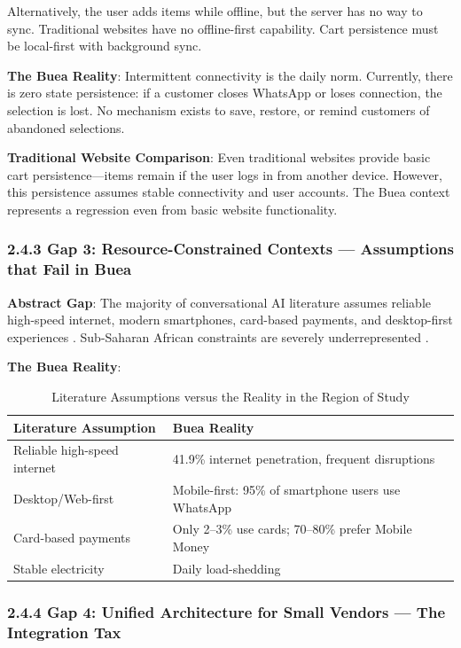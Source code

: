 \documentclass[12pt,a4paper]{article}
\begin{document}
Alternatively, the user adds items while offline, but the server has no way to sync. Traditional websites have no offline-first capability. Cart persistence must be local-first with background sync.

\textbf{The Buea Reality}: Intermittent connectivity is the daily norm. Currently, there is zero state persistence: if a customer closes WhatsApp or loses connection, the selection is lost. No mechanism exists to save, restore, or remind customers of abandoned selections.

\textbf{Traditional Website Comparison}: Even traditional websites provide basic cart persistence---items remain if the user logs in from another device. However, this persistence assumes stable connectivity and user accounts. The Buea context represents a regression even from basic website functionality.

\subsubsection{2.4.3 Gap 3: Resource-Constrained Contexts --- Assumptions that Fail in Buea}

\textbf{Abstract Gap}: The majority of conversational AI literature assumes reliable high-speed internet, modern smartphones, card-based payments, and desktop-first experiences \citep{lopez2025}. Sub-Saharan African constraints are severely underrepresented \citep{unesco2025}.

\textbf{The Buea Reality}:

\begin{table}[h]
\centering
\caption{Literature Assumptions versus the Reality in the Region of Study}
\label{tab:assumptions}
\begin{tabular}{p{6cm}p{6cm}}
\toprule
\textbf{Literature Assumption} & \textbf{Buea Reality} \\
\midrule
Reliable high-speed internet & 41.9\% internet penetration, frequent disruptions \\
Desktop/Web-first & Mobile-first: 95\% of smartphone users use WhatsApp \\
Card-based payments & Only 2--3\% use cards; 70--80\% prefer Mobile Money \\
Stable electricity & Daily load-shedding \\
\bottomrule
\end{tabular}
\end{table}

\subsubsection{2.4.4 Gap 4: Unified Architecture for Small Vendors --- The Integration Tax}
\end{document}
